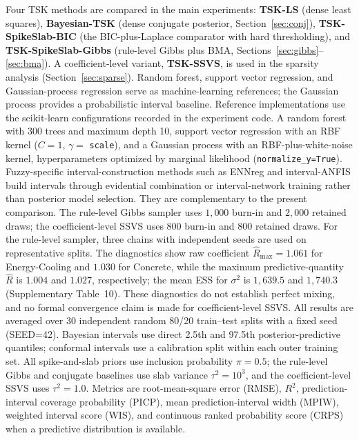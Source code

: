 \documentclass[1p,times]{elsarticle}
\begin{document}
Four TSK methods are compared in the main experiments: \textbf{TSK-LS} (dense least squares), \textbf{Bayesian-TSK} (dense conjugate posterior, Section~\ref{sec:conj}), \textbf{TSK-SpikeSlab-BIC} (the BIC-plus-Laplace comparator with hard thresholding), and \textbf{TSK-SpikeSlab-Gibbs} (rule-level Gibbs plus BMA, Sections~\ref{sec:gibbs}--\ref{sec:bma}).
A coefficient-level variant, \textbf{TSK-SSVS}, is used in the sparsity analysis (Section~\ref{sec:sparse}). Random forest, support vector regression, and Gaussian-process regression serve as machine-learning references; the Gaussian process provides a probabilistic interval baseline.
Reference implementations use the scikit-learn configurations recorded in the experiment code.
A random forest with 300 trees and maximum depth 10, support vector regression with an RBF kernel ($C=1$, $\gamma=$ \texttt{scale}), and a Gaussian process with an RBF-plus-white-noise kernel, hyperparameters optimized by marginal likelihood (\texttt{normalize\_y=True}).
Fuzzy-specific interval-construction methods such as ENNreg \cite{denoeux2023ennreg} and interval-ANFIS \cite{miskony2018predictionintervals} build intervals through evidential combination or interval-network training rather than posterior model selection.
They are complementary to the present comparison. The rule-level Gibbs sampler uses $1{,}000$ burn-in and $2{,}000$ retained draws; the coefficient-level SSVS uses $800$ burn-in and $800$ retained draws.
For the rule-level sampler, three chains with independent seeds are used on representative splits.
The diagnostics show raw coefficient \(\hat R_{\max}=1.061\) for Energy-Cooling and \(1.030\) for Concrete, while the maximum predictive-quantity \(\hat R\) is \(1.004\) and \(1.027\), respectively; the mean ESS for \(\sigma^2\) is \(1{,}639.5\) and \(1{,}740.3\) (Supplementary Table~10).
These diagnostics do not establish perfect mixing, and no formal convergence claim is made for coefficient-level SSVS.
All results are averaged over 30 independent random 80/20 train--test splits with a fixed seed (SEED=42).
Bayesian intervals use direct 2.5th and 97.5th posterior-predictive quantiles; conformal intervals use a calibration split within each outer training set.
All spike-and-slab priors use inclusion probability $\pi=0.5$; the rule-level Gibbs and conjugate baselines use slab variance $\tau^2=10^3$, and the coefficient-level SSVS uses $\tau^2=1.0$.
Metrics are root-mean-square error (RMSE), $R^2$, prediction-interval coverage probability (PICP), mean prediction-interval width (MPIW), weighted interval score (WIS), and continuous ranked probability score (CRPS) when a predictive distribution is available.
\end{document}
